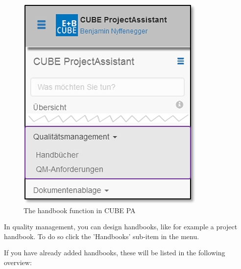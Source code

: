 \begin{figure}   %
  \vspace{-35pt}      %
  \begin{center}
    \includegraphics[width=1\linewidth]{../chapters/09_Qualitaetsmanagement/pictures/9-2_Menu_Qualitaetsmanagement_Handbuch.jpg}
  \end{center}
  \vspace{-20pt}
  \caption{The handbook function in CUBE PA}
  \vspace{-10pt}
\end{figure}

In quality management, you can design handbooks, like for example a project handbook. To do so click the 'Handbooks' sub-item in the menu.

\vspace{2.5cm}  

If you have already added handbooks, these will be listed in the following overview:

\vspace{3cm}  

